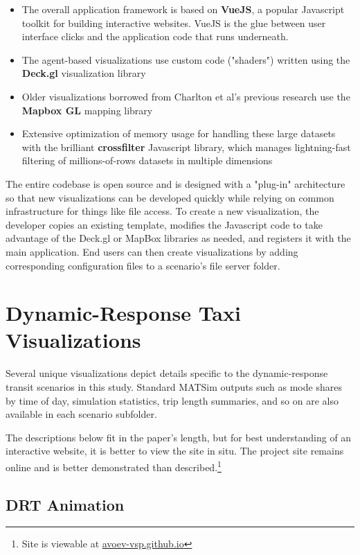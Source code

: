 \begin{itemize}
  \item The overall application framework is based on \textbf{VueJS}, a popular Javascript toolkit for building interactive websites. VueJS is the glue between user interface clicks and the application code that runs underneath.
  \item The agent-based visualizations use custom code ("shaders") written using the \textbf{Deck.gl} visualization library
  \item Older visualizations borrowed from Charlton et al's previous research use the \textbf{Mapbox GL} mapping library
  \item Extensive optimization of memory usage for handling these large datasets with the brilliant \textbf{crossfilter} Javascript library, which manages lightning-fast filtering of millions-of-rows datasets in multiple dimensions
\end{itemize}

The entire codebase is open source and is designed with a "plug-in" architecture so that new visualizations can be developed quickly while relying on common infrastructure for things like file access. To create a new visualization, the developer copies an existing template, modifies the Javascript code to take advantage of the Deck.gl or MapBox libraries as needed, and registers it with the main application. End users can then create visualizations by adding corresponding configuration files to a scenario's file server folder.

\section{Dynamic-Response Taxi Visualizations}
\label{drtviz}

Several unique visualizations depict details specific to the dynamic-response transit scenarios in this study. Standard MATSim outputs such as mode shares by time of day, simulation statistics, trip length summaries, and so on are also available in each scenario subfolder.

The descriptions below fit in the paper's length, but for best understanding of an interactive website, it is better to view the site in situ. The project site remains online and is better demonstrated than described.\footnote{Site is viewable at \href{https://avoev-vsp.github.io}{avoev-vsp.github.io}}

\subsection{DRT Animation}

